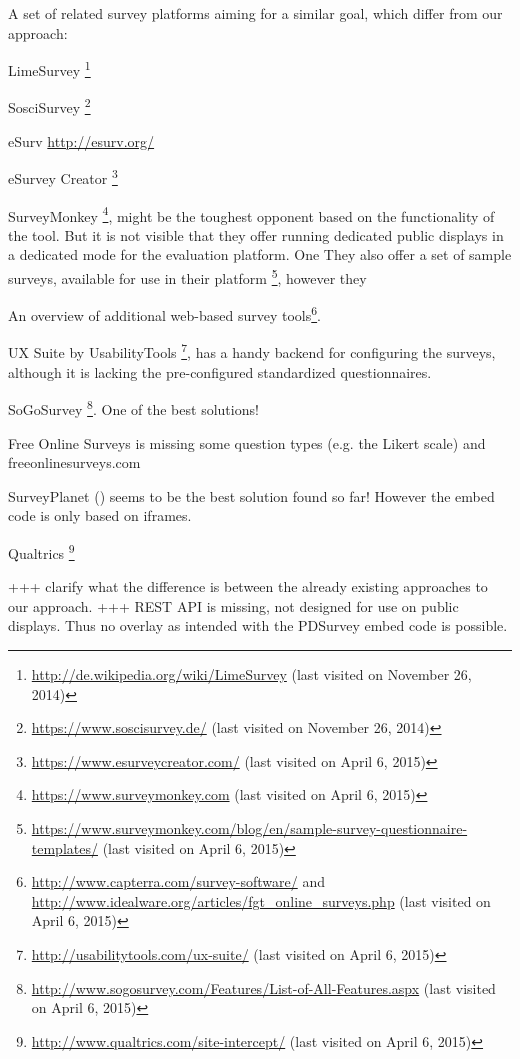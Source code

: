 	A set of related survey platforms aiming for a similar goal, which differ from our approach:

	LimeSurvey \footnote{\url{http://de.wikipedia.org/wiki/LimeSurvey} (last visited on November 26, 2014)}

	SosciSurvey \footnote{\url{https://www.soscisurvey.de/} (last visited on November 26, 2014)}

	eSurv \url{http://esurv.org/}



	eSurvey Creator \footnote{\url{https://www.esurveycreator.com/} (last visited on April 6, 2015)}

	SurveyMonkey \footnote{\url{https://www.surveymonkey.com} (last visited on April 6, 2015)}, might be the toughest opponent based on the functionality of the tool. But it is not visible that they offer running dedicated public displays in a dedicated mode for the evaluation platform. One
	They also offer a set of sample surveys, available for use in their platform \footnote{\url{https://www.surveymonkey.com/blog/en/sample-survey-questionnaire-templates/} (last visited on April 6, 2015)}, however they 

	An overview of additional web-based survey tools\footnote{\url{http://www.capterra.com/survey-software/} and \url{http://www.idealware.org/articles/fgt_online_surveys.php} (last visited on April 6, 2015)}.

	UX Suite by UsabilityTools \footnote{\url{http://usabilitytools.com/ux-suite/} (last visited on April 6, 2015)}, has a handy backend for configuring the surveys, although it is lacking the pre-configured standardized questionnaires. 

	SoGoSurvey \footnote{\url{http://www.sogosurvey.com/Features/List-of-All-Features.aspx} (last visited on April 6, 2015)}. One of the best solutions!

	Free Online Surveys is missing some question types (e.g. the Likert scale) and freeonlinesurveys.com

	SurveyPlanet () seems to be the best solution found so far! However the embed code is only based on iframes.

	Qualtrics \footnote{\url{http://www.qualtrics.com/site-intercept/} (last visited on April 6, 2015)}

	+++ clarify what the difference is between the already existing approaches to our approach.
	+++ REST API is missing, not designed for use on public displays. Thus no overlay as intended with the PDSurvey embed code is possible.




